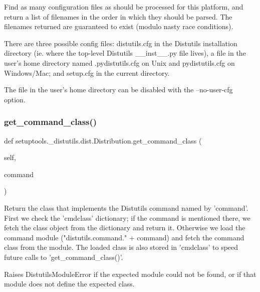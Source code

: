 \begin{DoxyVerb}Find as many configuration files as should be processed for this
platform, and return a list of filenames in the order in which they
should be parsed.  The filenames returned are guaranteed to exist
(modulo nasty race conditions).

There are three possible config files: distutils.cfg in the
Distutils installation directory (ie. where the top-level
Distutils __inst__.py file lives), a file in the user's home
directory named .pydistutils.cfg on Unix and pydistutils.cfg
on Windows/Mac; and setup.cfg in the current directory.

The file in the user's home directory can be disabled with the
--no-user-cfg option.
\end{DoxyVerb}
 \mbox{\label{classsetuptools_1_1__distutils_1_1dist_1_1Distribution_ae4d2002cf3e5eae8943b655ff03f1c9e}} 
\subsubsection{\texorpdfstring{get\+\_\+command\+\_\+class()}{get\_command\_class()}}
{\footnotesize\ttfamily def setuptools.\+\_\+distutils.\+dist.\+Distribution.\+get\+\_\+command\+\_\+class (\begin{DoxyParamCaption}\item[{}]{self,  }\item[{}]{command }\end{DoxyParamCaption})}

\begin{DoxyVerb}Return the class that implements the Distutils command named by
'command'.  First we check the 'cmdclass' dictionary; if the
command is mentioned there, we fetch the class object from the
dictionary and return it.  Otherwise we load the command module
("distutils.command." + command) and fetch the command class from
the module.  The loaded class is also stored in 'cmdclass'
to speed future calls to 'get_command_class()'.

Raises DistutilsModuleError if the expected module could not be
found, or if that module does not define the expected class.
\end{DoxyVerb}
 \mbox{\label{classsetuptools_1_1__distutils_1_1dist_1_1Distribution_acf451fb2069d16d5f310ea4284c1f48e}} 
